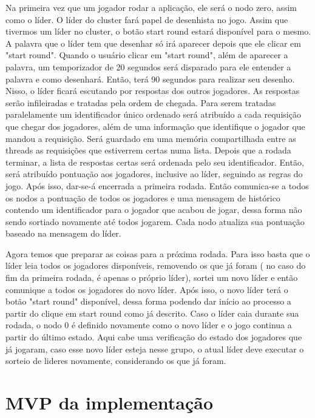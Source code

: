 \documentclass{article}
\begin{document}
Na primeira vez que um jogador rodar a aplicação, ele será o nodo zero, assim como o líder. O líder do cluster fará papel de desenhista no jogo. Assim que tivermos um líder no cluster, o botão start round estará disponível para o mesmo. A palavra que o líder tem que desenhar só irá aparecer depois que ele clicar em "start round". Quando o usuário clicar em "start round", além de aparecer a palavra, um temporizador de 20 segundos será disparado para ele entender a palavra e como desenhará. Então, terá 90 segundos para realizar seu desenho. Nisso, o líder ficará escutando por respostas dos outros jogadores. As respostas serão infileiradas e tratadas pela ordem de chegada. Para serem tratadas paralelamente um identificador único ordenado será atribuído a cada requisição que chegar dos jogadores, além de uma informação que identifique o jogador que mandou a requisição. Será guardado em uma memória compartilhada entre as threads as requisições que estiverrem certas numa lista. Depois que a rodada terminar, a lista de respostas certas será ordenada pelo seu identificador. Então, será atribuído pontuação aos jogadores, inclusive ao líder, seguindo as regras do jogo. Após isso, dar-se-á encerrada a primeira rodada. Então comunica-se a todos os nodos a pontuação de todos os jogadores e uma mensagem de histórico contendo um identificador para o jogador que acabou de jogar, dessa forma não sendo sortiado novamente até todos jogarem. Cada nodo atualiza sua pontuação baseado na mensagem do líder. 


Agora temos que preparar as coisas para a próxima rodada. Para isso basta que o líder leia todos os jogadores disponíveis, removendo os que já foram ( no caso do fim da primeira rodada, é apenas o próprio líder), sortei um novo líder e então comunique a todos os jogadores do novo líder. Após isso, o novo líder terá o botão "start round" disponível, dessa forma podendo dar início ao processo a partir do clique em start round como já descrito. Caso o líder caia durante sua rodada, o nodo 0 é definido novamente como o novo líder e o jogo continua a partir do último estado. Aqui cabe uma verificação do estado dos jogadores que já jogaram, caso esse novo líder esteja nesse grupo, o atual líder deve executar o sorteio de lideres novamente, considerando os que já foram. 


\section{MVP da implementação}
\end{document}
